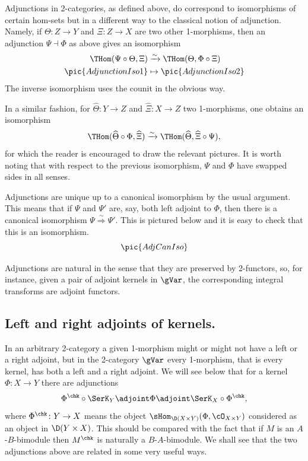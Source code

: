 Adjunctions in 2-categories, as defined above, do correspond to
isomorphisms of certain hom-sets but in a different way to the
classical notion of adjunction.  Namely, if $\Theta\colon Z\to Y$ and
$\Xi\colon Z\to X$ are two other 1-morphisms, then an adjunction
$\Psi\dashv \Phi$ as above gives an isomorphism
\begin{align*}
  \THom(\Psi\circ\Theta,\Xi)&\xrightarrow{\sim}\THom(\Theta,
  \Phi\circ \Xi)\\
  \pic{AdjunctionIso1}&\mapsto \pic{AdjunctionIso2}
\end{align*}
The inverse isomorphism uses the counit in the obvious way.

In a similar fashion, for $\widehat\Theta\colon Y\to Z$ and $\widehat\Xi\colon
X\to Z$ two 1-morphisms, one obtains an isomorphism
\[\THom(\widehat\Theta\circ\Phi,\widehat\Xi)\xrightarrow{\sim}\THom(\widehat\Theta,
\widehat\Xi\circ\Psi),\]
for which the reader is encouraged to draw the relevant pictures.  It
is worth noting that with respect to the previous isomorphism, $\Psi$
and $\Phi$ have swapped sides in all senses.


Adjunctions are unique up to a canonical isomorphism by the usual
argument.  This means that if $\Psi$ and $\Psi'$ are, say, both left
adjoint to $\Phi$, then there is a canonical isomorphism
$\Psi\stackrel{\sim}\Longrightarrow\Psi'$.  This is pictured below and
it is easy to check that this is an isomorphism.
\[\pic{AdjCanIso}\]

Adjunctions are natural in the sense that they are preserved by
2-func\-tors, so, for instance, given a pair of adjoint kernels in
$\gVar$, the corresponding integral transforms are adjoint functors.

 \subsection{Left and right adjoints of kernels.}
\label{subsec:leftrightadjoints}
\label{subsec:yphimphi}
In an arbitrary 2-category a given 1-morphism might or might not have
a left or a right adjoint, but in the 2-category $\gVar$ every
1-morphism, that is every kernel, has both a left and a right adjoint.
We will see below that for a kernel $\Phi\colon X\to Y$ there are
adjunctions
\[\Phi^\chk\circ\SerK_Y\adjoint\Phi\adjoint \SerK_X\circ
\Phi^\chk,\]
where $\Phi^\chk\colon Y\to X$ means the object $\sHom_{\D(X\times
  Y)}(\Phi,\cO_{X\times Y})$ considered as an object in $\D(Y\times
X)$.  This should be compared with the fact that if $M$ is an
$A$-$B$-bimodule then $M^\chk$ is naturally a $B$-$A$-bimodule.  We
shall see that the two adjunctions above are related in some very
useful ways.


